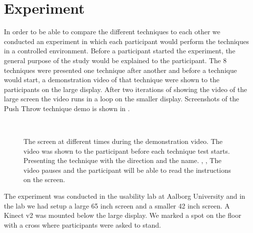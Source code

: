 \section{Experiment} \label{sec:experiment}
In order to be able to compare the different techniques to each other we conducted an experiment in which each participant would perform the techniques in a controlled environment.
Before a participant started the experiment, the general purpose of the study would be explained to the participant.
The 8 techniques were presented one technique after another and before a technique would start, a demonstration video of that technique were shown to the participants on the large display.
After two iterations of showing the video of the large screen the video runs in a loop on the smaller display.
Screenshots of the Push Throw technique demo is shown in .

\begin{figure}[H]
\\
\caption{The screen at different times during the demonstration video. The video was shown to the participant before each technique test starts. \protect{} Presenting the technique with the direction and the name. \protect{}, \protect{}, \protect{} The video pauses and the participant will be able to read the instructions on the screen.}
\label{fig:demovideo}
\end{figure}

The experiment was conducted in the usability lab at Aalborg University and in the lab we had setup a large 65 inch screen and a smaller 42 inch screen. 
A Kinect v2 was mounted below the large display.
We marked a spot on the floor with a cross where participants were asked to stand.